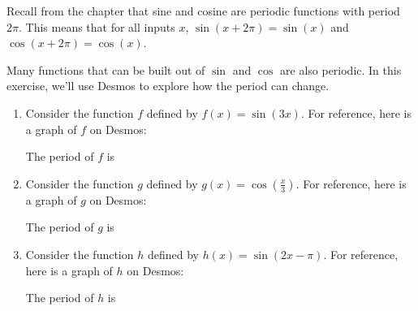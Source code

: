 \documentclass{ximera}
\author{Kenneth Berglund}
\begin{document}
\begin{exercise}
Recall from the chapter that sine and cosine are periodic functions with period $2\pi$. This means that for all inputs $x$, $\sin(x + 2\pi) = \sin(x)$ and $\cos(x + 2\pi) = \cos(x)$. 

Many functions that can be built out of $\sin$ and $\cos$ are also periodic. In this exercise, we'll use Desmos to explore how the period can change. 

\begin{enumerate}

\item Consider the function $f$ defined by $f(x) = \sin(3x)$. For reference, here is a graph of $f$ on Desmos:
\begin{center}
\end{center}

The period of $f$ is
\begin{multipleChoice}
\end{multipleChoice}

\item Consider the function $g$ defined by $g(x) = \cos\left(\frac{x}{3}\right)$. For reference, here is a graph of $g$ on Desmos:
\begin{center}
\end{center}

The period of $g$ is
\begin{multipleChoice}
\end{multipleChoice}

\item Consider the function $h$ defined by $h(x) = \sin(2x - \pi)$. For reference, here is a graph of $h$ on Desmos:
\begin{center}
\end{center}

The period of $h$ is
\begin{multipleChoice}
\end{multipleChoice}

\end{enumerate}

\end{exercise}
\end{document}
